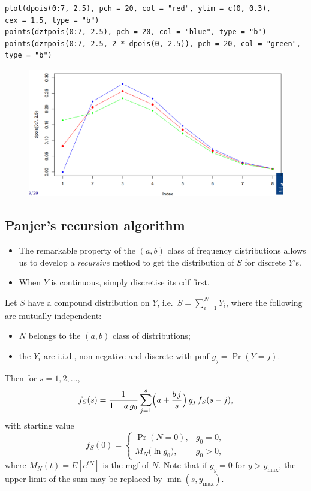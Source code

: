 \documentclass[11pt]{article}
\newcommand{\noi}{\noindent}
\begin{document}
\begin{lstlisting}
plot(dpois(0:7, 2.5), pch = 20, col = "red", ylim = c(0, 0.3),
cex = 1.5, type = "b")
points(dztpois(0:7, 2.5), pch = 20, col = "blue", type = "b")
points(dzmpois(0:7, 2.5, 2 * dpois(0, 2.5)), pch = 20, col = "green",
type = "b")
\end{lstlisting}

\begin{figure}[H]
    \centering
    \includegraphics[width=0.7\linewidth]{zero-modified dist R example.png}
\end{figure}

\subsection{Panjer’s recursion algorithm}
\noi
\begin{itemize}
  \item The remarkable property of the \((a,b)\) class of frequency distributions allows us to develop a \emph{recursive} method to get the distribution of \(S\) for discrete \(Y\)'s.
  \item When \(Y\) is continuous, simply discretise its cdf first.
\end{itemize} \phantom{i}

\noi Let \(S\) have a compound distribution on \(Y\), i.e.\ \(S=\sum_{i=1}^N Y_i\), where the following are mutually independent:
\begin{itemize}
  \item \(N\) belongs to the \((a,b)\) class of distributions;
  \item the \(Y_i\) are i.i.d., non‐negative and discrete with pmf \(g_j=\Pr(Y=j)\).
\end{itemize}
\noi Then for \(s=1,2,\dots\),
\[
f_S(s)
=\frac{1}{1 - a\,g_0}
\sum_{j=1}^{s}
\Bigl(a + \frac{b\,j}{s}\Bigr)\,g_j\,f_S(s-j),
\]
with starting value
\[
f_S(0)
=\begin{cases}
\Pr(N=0), & g_0=0,\\[0.3em]
M_N\bigl(\ln g_0\bigr), & g_0>0,
\end{cases}
\]
\noi where \(M_N(t)=E[e^{tN}]\) is the mgf of \(N\).  Note that if \(g_y=0\) for \(y>y_{\max}\), the upper limit of the sum may be replaced by \(\min(s,y_{\max})\).
\end{document}
